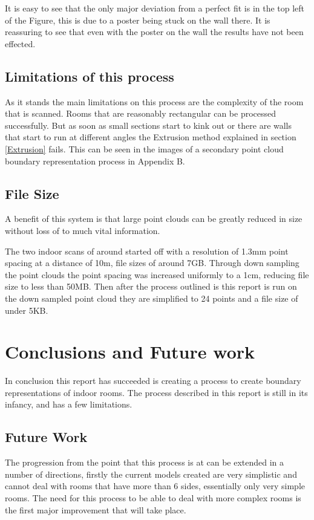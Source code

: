 		It is easy to see that the only major deviation from a perfect fit is in the top left of the Figure, this is due to a poster being stuck on the wall there. It is reassuring to see that even with the poster on the wall the results have not been effected.
	
	\section{Limitations of this process}
		As it stands the main limitations on this process are the complexity of the room that is scanned. Rooms that are reasonably rectangular can be processed successfully. But as soon as small sections start to kink out or there are walls that start to run at different angles the Extrusion method explained in section \ref{Extrusion} fails. This can be seen in the images of a secondary point cloud boundary representation process in Appendix B.
		
	\section{File Size}
		A benefit of this system is that large point clouds can be greatly reduced in size without loss of to much vital information. 
		
		The two indoor scans of around started off with a resolution of 1.3mm point spacing at a distance of 10m, file sizes of around 7GB. Through down sampling the point clouds the point spacing was increased uniformly to a 1cm, reducing file size to less than 50MB. Then after the process outlined is this report is run on the down sampled point cloud they are simplified to 24 points and a file size of under 5KB.
		

	
\chapter{Conclusions and Future work}

In conclusion this report has succeeded is creating a process to create boundary representations of indoor rooms. The process described in this report is still in its infancy, and has a few limitations.	

\section{Future Work}
	The progression from the point that this process is at can be extended in a number of directions, firstly the current models created are very simplistic and cannot deal with rooms that have more than 6 sides, essentially only very simple rooms. The need for this process to be able to deal with more complex rooms is the first major improvement that will take place. 
	
